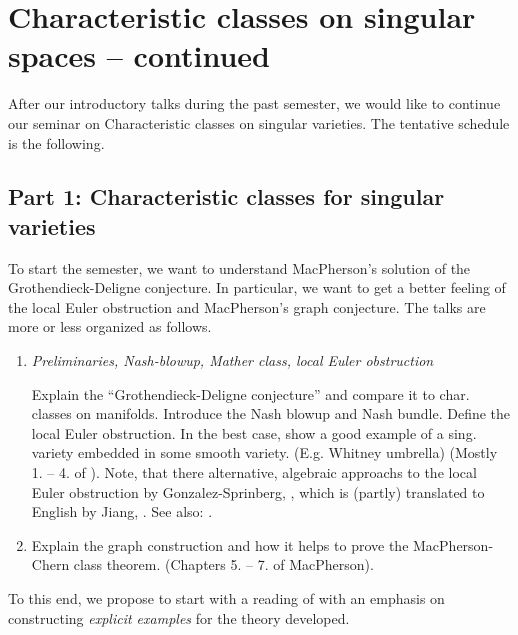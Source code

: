 \documentclass[a4paper]{article}
\begin{document}
\section{Characteristic classes on singular spaces -- continued}

After our introductory talks during the past semester, we would like to 
continue our seminar on Characteristic classes on singular varieties. 
The tentative schedule is the following.

\subsection{Part 1: Characteristic classes for singular varieties}
To start the semester, we want to understand MacPherson's solution of the
Grothendieck-Deligne conjecture. In particular, we want to get a better 
feeling of the local Euler obstruction and MacPherson's graph conjecture.
The talks are more or less organized as follows.
\begin{enumerate}
\item \emph{Preliminaries, Nash-blowup, Mather class, local Euler obstruction}


    Explain the ``Grothendieck-Deligne conjecture'' and compare it to char. 
    classes on manifolds. Introduce the Nash blowup and Nash bundle.
    Define the local Euler obstruction. In the best case,
    show a good example of a sing. variety embedded in some smooth variety.
    (E.g. Whitney umbrella) (Mostly 1. -- 4. of \cite{MacPherson74}).
    Note, that there alternative, algebraic approachs to the local 
    Euler obstruction by Gonzalez-Sprinberg, \cite{Gonzalez81}, 
    which is (partly) translated to English by Jiang, \cite{Jiang19}.
    See also: \cite{Kennedy90}.
\item Explain the graph construction and how it helps to prove the MacPherson-Chern 
    class theorem. (Chapters 5. -- 7. of MacPherson).
\end{enumerate}

To this end, we propose to start with a reading of \cite{MacPherson74} 
with an emphasis on constructing \textit{explicit examples} for the theory 
developed. 
\end{document}
